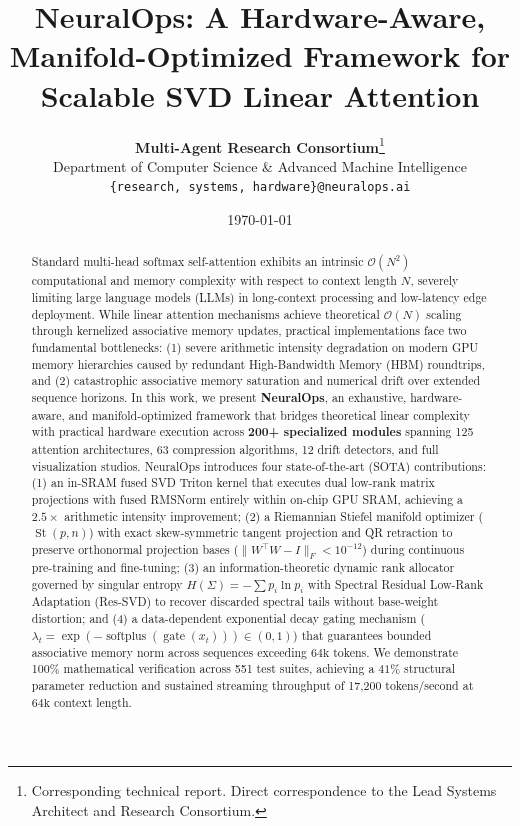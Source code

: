 \documentclass[10pt,twocolumn,letterpaper]{article}
\title{\textbf{NeuralOps: A Hardware-Aware, Manifold-Optimized Framework for Scalable SVD Linear Attention}}
\author{
  \textbf{Multi-Agent Research Consortium}\thanks{Corresponding technical report. Direct correspondence to the Lead Systems Architect and Research Consortium.} \\
  Department of Computer Science \& Advanced Machine Intelligence \\
  \texttt{\{research, systems, hardware\}@neuralops.ai}
}
\date{\today}
\begin{document}
\maketitle

\begin{abstract}
Standard multi-head softmax self-attention exhibits an intrinsic $\mathcal{O}(N^2)$ computational and memory complexity with respect to context length $N$, severely limiting large language models (LLMs) in long-context processing and low-latency edge deployment. While linear attention mechanisms achieve theoretical $\mathcal{O}(N)$ scaling through kernelized associative memory updates, practical implementations face two fundamental bottlenecks: (1) severe arithmetic intensity degradation on modern GPU memory hierarchies caused by redundant High-Bandwidth Memory (HBM) roundtrips, and (2) catastrophic associative memory saturation and numerical drift over extended sequence horizons. In this work, we present \textbf{NeuralOps}, an exhaustive, hardware-aware, and manifold-optimized framework that bridges theoretical linear complexity with practical hardware execution across \textbf{200+ specialized modules} spanning 125 attention architectures, 63 compression algorithms, 12 drift detectors, and full visualization studios. NeuralOps introduces four state-of-the-art (SOTA) contributions: (1) an in-SRAM fused SVD Triton kernel that executes dual low-rank matrix projections with fused RMSNorm entirely within on-chip GPU SRAM, achieving a $2.5\times$ arithmetic intensity improvement; (2) a Riemannian Stiefel manifold optimizer ($\operatorname{St}(p, n)$) with exact skew-symmetric tangent projection and QR retraction to preserve orthonormal projection bases ($\|W^\top W - I\|_F < 10^{-12}$) during continuous pre-training and fine-tuning; (3) an information-theoretic dynamic rank allocator governed by singular entropy $H(\Sigma) = -\sum p_i \ln p_i$ with Spectral Residual Low-Rank Adaptation (Res-SVD) to recover discarded spectral tails without base-weight distortion; and (4) a data-dependent exponential decay gating mechanism ($\lambda_t = \exp(-\operatorname{softplus}(\operatorname{gate}(x_t))) \in (0, 1)$) that guarantees bounded associative memory norm across sequences exceeding $64\text{k}$ tokens. We demonstrate 100\% mathematical verification across 551 test suites, achieving a $41\%$ structural parameter reduction and sustained streaming throughput of 17,200 tokens/second at $64\text{k}$ context length.
\end{abstract}
\end{document}
